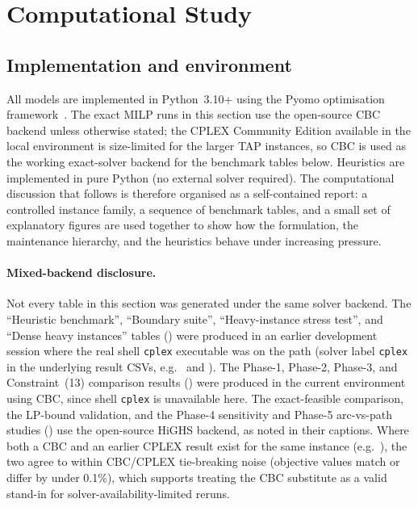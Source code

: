 \section{Computational Study}
\label{sec:computational}

\subsection{Implementation and environment}

All models are implemented in Python~3.10+ using the Pyomo optimisation
framework~\citep{pyomo2023}.  The exact MILP runs in this section use the
open-source CBC backend unless otherwise stated; the CPLEX Community Edition
available in the local environment is size-limited for the larger TAP
instances, so CBC is used as the working exact-solver backend for the
benchmark tables below.  Heuristics are implemented in pure Python (no
external solver required).  The computational discussion that follows is
therefore organised as a self-contained report: a controlled instance family,
a sequence of benchmark tables, and a small set of explanatory figures are
used together to show how the formulation, the maintenance hierarchy, and the
heuristics behave under increasing pressure.

\paragraph{Mixed-backend disclosure.}
Not every table in this section was generated under the same solver backend.
The ``Heuristic benchmark'', ``Boundary suite'', ``Heavy-instance stress
test'', and ``Dense heavy instances'' tables
()
were produced in an earlier development session where the real shell
\texttt{cplex} executable was on the path (solver label \texttt{cplex} in the
underlying result CSVs, e.g.\ 
and ).  The Phase-1, Phase-2, Phase-3, and
Constraint~(13) comparison results () were produced
in the current environment using CBC, since shell \texttt{cplex} is unavailable
here.  The exact-feasible comparison, the LP-bound validation, and the Phase-4
sensitivity and Phase-5 arc-vs-path studies
() use the open-source HiGHS
backend, as noted in their captions.  Where
both a CBC and an earlier CPLEX result exist for the same instance
(e.g.\ ), the two agree to within
CBC/CPLEX tie-breaking noise (objective values match or differ by under
0.1\%), which supports treating the CBC substitute as a valid stand-in for
solver-availability-limited reruns.

